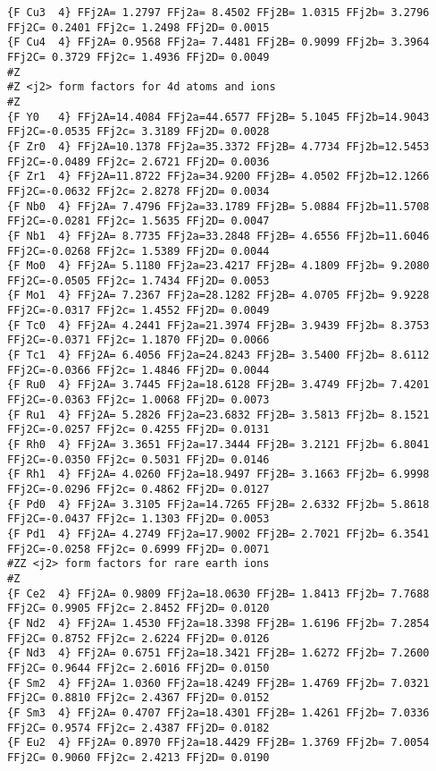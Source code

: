 {\begin{verbatim}
{F Cu3  4} FFj2A= 1.2797 FFj2a= 8.4502 FFj2B= 1.0315 FFj2b= 3.2796 FFj2C= 0.2401 FFj2c= 1.2498 FFj2D= 0.0015 
{F Cu4  4} FFj2A= 0.9568 FFj2a= 7.4481 FFj2B= 0.9099 FFj2b= 3.3964 FFj2C= 0.3729 FFj2c= 1.4936 FFj2D= 0.0049 
#Z
#Z <j2> form factors for 4d atoms and ions
#Z
{F Y0   4} FFj2A=14.4084 FFj2a=44.6577 FFj2B= 5.1045 FFj2b=14.9043 FFj2C=-0.0535 FFj2c= 3.3189 FFj2D= 0.0028 
{F Zr0  4} FFj2A=10.1378 FFj2a=35.3372 FFj2B= 4.7734 FFj2b=12.5453 FFj2C=-0.0489 FFj2c= 2.6721 FFj2D= 0.0036 
{F Zr1  4} FFj2A=11.8722 FFj2a=34.9200 FFj2B= 4.0502 FFj2b=12.1266 FFj2C=-0.0632 FFj2c= 2.8278 FFj2D= 0.0034 
{F Nb0  4} FFj2A= 7.4796 FFj2a=33.1789 FFj2B= 5.0884 FFj2b=11.5708 FFj2C=-0.0281 FFj2c= 1.5635 FFj2D= 0.0047 
{F Nb1  4} FFj2A= 8.7735 FFj2a=33.2848 FFj2B= 4.6556 FFj2b=11.6046 FFj2C=-0.0268 FFj2c= 1.5389 FFj2D= 0.0044 
{F Mo0  4} FFj2A= 5.1180 FFj2a=23.4217 FFj2B= 4.1809 FFj2b= 9.2080 FFj2C=-0.0505 FFj2c= 1.7434 FFj2D= 0.0053 
{F Mo1  4} FFj2A= 7.2367 FFj2a=28.1282 FFj2B= 4.0705 FFj2b= 9.9228 FFj2C=-0.0317 FFj2c= 1.4552 FFj2D= 0.0049 
{F Tc0  4} FFj2A= 4.2441 FFj2a=21.3974 FFj2B= 3.9439 FFj2b= 8.3753 FFj2C=-0.0371 FFj2c= 1.1870 FFj2D= 0.0066 
{F Tc1  4} FFj2A= 6.4056 FFj2a=24.8243 FFj2B= 3.5400 FFj2b= 8.6112 FFj2C=-0.0366 FFj2c= 1.4846 FFj2D= 0.0044 
{F Ru0  4} FFj2A= 3.7445 FFj2a=18.6128 FFj2B= 3.4749 FFj2b= 7.4201 FFj2C=-0.0363 FFj2c= 1.0068 FFj2D= 0.0073 
{F Ru1  4} FFj2A= 5.2826 FFj2a=23.6832 FFj2B= 3.5813 FFj2b= 8.1521 FFj2C=-0.0257 FFj2c= 0.4255 FFj2D= 0.0131 
{F Rh0  4} FFj2A= 3.3651 FFj2a=17.3444 FFj2B= 3.2121 FFj2b= 6.8041 FFj2C=-0.0350 FFj2c= 0.5031 FFj2D= 0.0146 
{F Rh1  4} FFj2A= 4.0260 FFj2a=18.9497 FFj2B= 3.1663 FFj2b= 6.9998 FFj2C=-0.0296 FFj2c= 0.4862 FFj2D= 0.0127 
{F Pd0  4} FFj2A= 3.3105 FFj2a=14.7265 FFj2B= 2.6332 FFj2b= 5.8618 FFj2C=-0.0437 FFj2c= 1.1303 FFj2D= 0.0053 
{F Pd1  4} FFj2A= 4.2749 FFj2a=17.9002 FFj2B= 2.7021 FFj2b= 6.3541 FFj2C=-0.0258 FFj2c= 0.6999 FFj2D= 0.0071 
#ZZ <j2> form factors for rare earth ions
#Z
{F Ce2  4} FFj2A= 0.9809 FFj2a=18.0630 FFj2B= 1.8413 FFj2b= 7.7688 FFj2C= 0.9905 FFj2c= 2.8452 FFj2D= 0.0120 
{F Nd2  4} FFj2A= 1.4530 FFj2a=18.3398 FFj2B= 1.6196 FFj2b= 7.2854 FFj2C= 0.8752 FFj2c= 2.6224 FFj2D= 0.0126 
{F Nd3  4} FFj2A= 0.6751 FFj2a=18.3421 FFj2B= 1.6272 FFj2b= 7.2600 FFj2C= 0.9644 FFj2c= 2.6016 FFj2D= 0.0150 
{F Sm2  4} FFj2A= 1.0360 FFj2a=18.4249 FFj2B= 1.4769 FFj2b= 7.0321 FFj2C= 0.8810 FFj2c= 2.4367 FFj2D= 0.0152 
{F Sm3  4} FFj2A= 0.4707 FFj2a=18.4301 FFj2B= 1.4261 FFj2b= 7.0336 FFj2C= 0.9574 FFj2c= 2.4387 FFj2D= 0.0182 
{F Eu2  4} FFj2A= 0.8970 FFj2a=18.4429 FFj2B= 1.3769 FFj2b= 7.0054 FFj2C= 0.9060 FFj2c= 2.4213 FFj2D= 0.0190 

\end{verbatim}}
